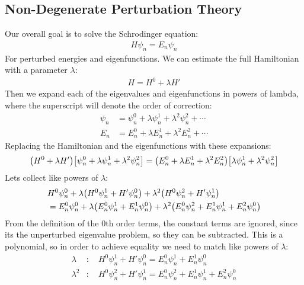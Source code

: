\subsection{Non-Degenerate Perturbation Theory}
Our overall goal is to solve the Schrodinger equation:
\begin{align*}
  H\psi_n=E_n\psi_n
\end{align*}
For perturbed energies and eigenfunctions. We can estimate the full Hamiltonian with a parameter $\lambda$:
\begin{align*}
  H=H^0+\lambda H'
\end{align*}
Then we expand each of the eigenvalues and eigenfunctions in powers of lambda, where the superscript will denote the order of correction:
\begin{align*}
  \psi_n&=\psi_n^0+\lambda\psi_n^1+\lambda^2\psi_n^2+\cdots\\
  E_n&=E_n^0+\lambda E_n^1+\lambda^2E_n^2+\cdots
\end{align*}
Replacing the Hamiltonian and the eigenfunctions with these expansions:
\begin{align*}
  \qty(H^0+\lambda H')\qty[\psi_n^0+\lambda\psi_n^1+\lambda^2\psi_n^2]=
  \qty(E_n^0+\lambda E_n^1+\lambda^2E_n^2)\qty[\lambda\psi_n^1+\lambda^2\psi_n^2]
\end{align*}
Lets collect like powers of $\lambda$:
\begin{align*}
  &H^0\psi_n^0+\lambda\qty(H^0\psi_n^1+H'\psi_n^0)+\lambda^2\qty(H^0\psi_n^2+H'\psi_n^1)\\
  &=E_n^0\psi_n^0+\lambda\qty(E_n^0\psi_n^1+E_n^1\psi_n^0)+
  \lambda^2\qty(E_n^0\psi_n^2+E_n^1\psi_n^1+E_n^2\psi_n^0)
\end{align*}
From the definition of the 0th order terms, the constant terms are ignored, since its the unperturbed eigenvalue problem, so they can be subtracted. This is a polynomial, so in order to achieve equality we need to match like powers of $\lambda$:
\begin{align*}
  \lambda&:\quad H^0\psi_n^1+H'\psi_n^0=E_n^0\psi_n^1+E_n^1\psi_n^0\\
  \lambda^2&:\quad H^0\psi_n^2+H'\psi_n^1=E_n^0\psi_n^2+E_n^1\psi_n^1+E_n^2\psi_n^0
\end{align*}
